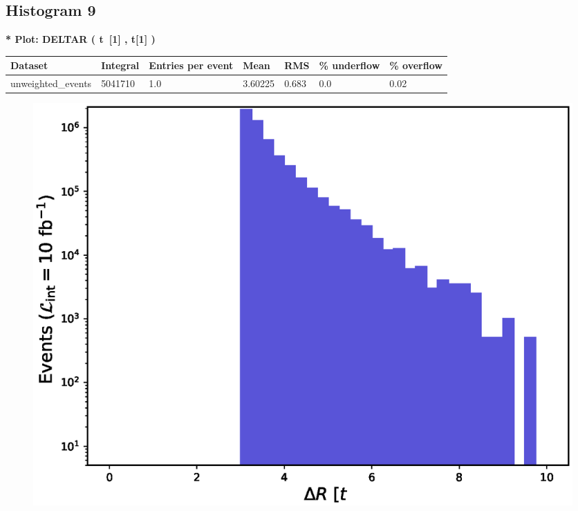 \documentclass[a4paper, 10pt]{article}
\begin{document}
\subsection{ Histogram 9}

\textbf{* Plot: DELTAR ( t~[1] , t[1] ) }\\
   \begin{table}[H]
  \begin{center}
    \begin{tabular}{|m{23.0mm}|m{23.0mm}|m{18.0mm}|m{19.0mm}|m{19.0mm}|m{19.0mm}|m{19.0mm}|}
      \hline
      {\cellcolor{yellow}         Dataset}& {\cellcolor{yellow}         Integral}& {\cellcolor{yellow}         Entries per event}& {\cellcolor{yellow}         Mean}& {\cellcolor{yellow}         RMS}& {\cellcolor{yellow}         \% underflow}& {\cellcolor{yellow}         \% overflow}\\
      \hline
      {\cellcolor{white}         unweighted\_events}& {\cellcolor{white}         5041710}& {\cellcolor{white}         1.0}& {\cellcolor{white}         3.60225}& {\cellcolor{white}         0.683}& {\cellcolor{green}         0.0}& {\cellcolor{green}         0.02}\\
\hline
    \end{tabular}
  \end{center}
\end{table}

\begin{figure}[H]
  \begin{center}
    \includegraphics[scale=0.45]{selection_8.eps}\\
\caption{   }
  \end{center}
\end{figure}
      
\end{document}

